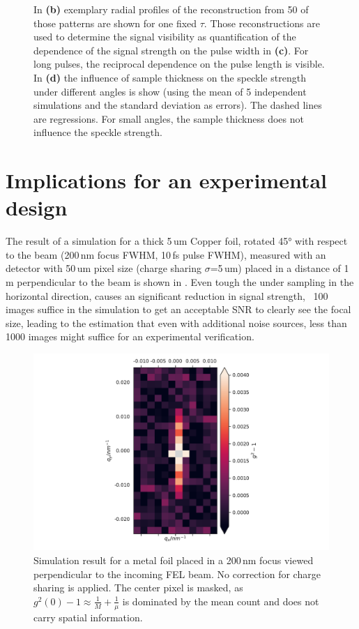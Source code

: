 \begin{figure}
{	In \textbf{(b)} exemplary radial profiles of the reconstruction from 50 of those patterns are shown for one fixed $\tau$. Those reconstructions are used to determine the signal visibility as quantification of the  dependence of the signal strength on the pulse width in \textbf{(c)}. For long pulses, the reciprocal dependence on the pulse length is visible.
	In \textbf{(d)}  the influence of sample thickness on the speckle strength under different angles is show (using the mean of 5 independent simulations and the standard deviation as errors). The dashed lines are  regressions. For small angles, the sample thickness does not influence the speckle strength.}
\end{figure}



\section{Implications for an experimental design}

The result of a simulation for a thick 5\,um Copper foil, rotated 45° with respect to the beam (200\,nm focus FWHM, 10\,fs pulse FWHM), measured with an detector with 50\,um pixel size (charge sharing $\sigma$=5\,um) placed in a distance of 1\,m  perpendicular to the beam is shown in . Even tough the under sampling in the horizontal direction, causes an significant reduction in signal strength, ~100 images suffice in the simulation to get an acceptable SNR to clearly see the  focal size, leading to the estimation that even with additional noise sources, less than 1000 images might suffice for an experimental verification.

\begin{figure}
	\centering
	\includegraphics[width=0.5\linewidth]{images/sim_foil5umCu_shared.pdf}

	\caption[Simulation of a metal foil with similar parameters as used in the experiment]{Simulation result for a metal foil placed in a 200\,nm focus viewed perpendicular to the incoming FEL beam. No correction for charge sharing is applied. The center pixel is masked, as $g^2(0)-1\approx 
		\frac{1}{M}+\frac{1}{\mu}$ is dominated by the mean count and does 
		not carry spatial information.}
	\label{fig:simfoil}
\end{figure}


